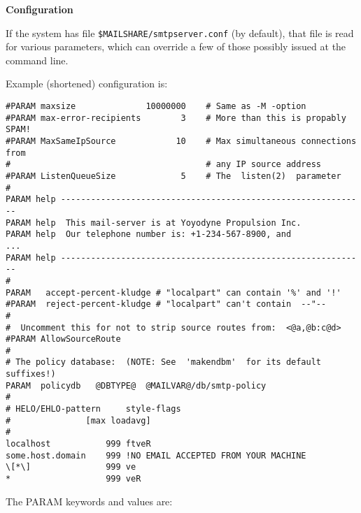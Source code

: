 {\bf Configuration}

If the system has file  {\tt \$MAILSHARE/smtpserver.conf} (by default),
that file is read for various parameters, which can override a few
of those possibly issued at the command line.

Example (shortened) configuration is:

\begin{small}
\begin{verbatim}
#PARAM maxsize              10000000    # Same as -M -option
#PARAM max-error-recipients        3    # More than this is propably SPAM!
#PARAM MaxSameIpSource            10    # Max simultaneous connections from
#                                       # any IP source address
#PARAM ListenQueueSize             5    # The  listen(2)  parameter
#
PARAM help -------------------------------------------------------------
PARAM help  This mail-server is at Yoyodyne Propulsion Inc.
PARAM help  Our telephone number is: +1-234-567-8900, and
...
PARAM help -------------------------------------------------------------
#
PARAM   accept-percent-kludge # "localpart" can contain '%' and '!'
#PARAM  reject-percent-kludge # "localpart" can't contain  --"--
#
#  Uncomment this for not to strip source routes from:  <@a,@b:c@d>
#PARAM AllowSourceRoute
#
# The policy database:  (NOTE: See  'makendbm'  for its default suffixes!)
PARAM  policydb   @DBTYPE@  @MAILVAR@/db/smtp-policy
#
# HELO/EHLO-pattern     style-flags
#               [max loadavg]
#
localhost           999 ftveR
some.host.domain    999 !NO EMAIL ACCEPTED FROM YOUR MACHINE
\[*\]               999 ve
*                   999 veR
\end{verbatim}
\end{small}





The PARAM keywords and values are:

